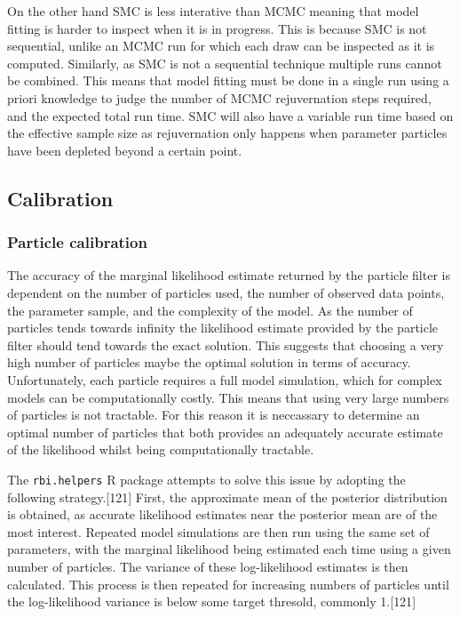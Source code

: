 \documentclass[11pt,twoside]{bristolthesis}
\begin{document}
  On the other hand SMC is less interative than MCMC meaning that model fitting is harder to inspect when it is in progress. This is because SMC is not sequential, unlike an MCMC run for which each draw can be inspected as it is computed. Similarly, as SMC is not a sequential technique multiple runs cannot be combined. This means that model fitting must be done in a single run using a priori knowledge to judge the number of MCMC rejuvernation steps required, and the expected total run time. SMC will also have a variable run time based on the effective sample size as rejuvernation only happens when parameter particles have been depleted beyond a certain point.
  
  \hypertarget{calibration}{%
  \subsection{Calibration}\label{calibration}}
  
  \hypertarget{particle-calibration}{%
  \subsubsection{Particle calibration}\label{particle-calibration}}
  
  The accuracy of the marginal likelihood estimate returned by the particle filter is dependent on the number of particles used, the number of observed data points, the parameter sample, and the complexity of the model. As the number of particles tends towards infinity the likelihood estimate provided by the particle filter should tend towards the exact solution. This suggests that choosing a very high number of particles maybe the optimal solution in terms of accuracy. Unfortunately, each particle requires a full model simulation, which for complex models can be computationally costly. This means that using very large numbers of particles is not tractable. For this reason it is neccassary to determine an optimal number of particles that both provides an adequately accurate estimate of the likelihood whilst being computationally tractable.
  
  The \texttt{rbi.helpers} R package attempts to solve this issue by adopting the following strategy.{[}121{]} First, the approximate mean of the posterior distribution is obtained, as accurate likelihood estimates near the posterior mean are of the most interest. Repeated model simulations are then run using the same set of parameters, with the marginal likelihood being estimated each time using a given number of particles. The variance of these log-likelihood estimates is then calculated. This process is then repeated for increasing numbers of particles until the log-likelihood variance is below some target thresold, commonly 1.{[}121{]}
  
\end{document}
